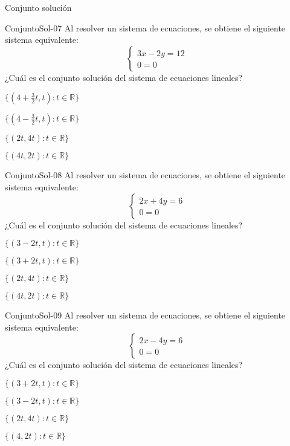\documentclass[a4,11pt]{aleph-notas}
\begin{document}
\begin{quiz}{Conjunto solución}
\begin{multi}[]%
    {ConjuntoSol-07}
    Al resolver un sistema de ecuaciones, se obtiene el siguiente sistema equivalente:
    \[
        \begin{cases}
            3x - 2y = 12 \\
            0 = 0
        \end{cases}
    \]
    ¿Cuál es el conjunto solución del sistema de ecuaciones lineales?
    \item* $\{(4+\frac{3}{2}t, t) : t\in \mathbb{R}\}$
    \item $\{(4-\frac{3}{2}t, t) : t\in \mathbb{R}\}$
    \item $\{(2t,4t) : t\in \mathbb{R}\}$
    \item $\{(4t,2t) : t\in \mathbb{R}\}$
\end{multi}

\begin{multi}[]%
    {ConjuntoSol-08}
    Al resolver un sistema de ecuaciones, se obtiene el siguiente sistema equivalente:
    \[
        \begin{cases}
            2x +4y = 6 \\
            0 = 0
        \end{cases}
    \]
    ¿Cuál es el conjunto solución del sistema de ecuaciones lineales?
    \item* $\{(3-2t, t) : t\in \mathbb{R}\}$
    \item $\{(3+2t, t) : t\in \mathbb{R}\}$
    \item $\{(2t,4t) : t\in \mathbb{R}\}$
    \item $\{(4t,2t) : t\in \mathbb{R}\}$
\end{multi}

\begin{multi}[]%
    {ConjuntoSol-09}
    Al resolver un sistema de ecuaciones, se obtiene el siguiente sistema equivalente:
    \[
        \begin{cases}
            2x - 4y = 6 \\
            0 = 0
        \end{cases}
    \]
    ¿Cuál es el conjunto solución del sistema de ecuaciones lineales?
    \item* $\{(3+2t, t) : t\in \mathbb{R}\}$
    \item $\{(3-2t, t) : t\in \mathbb{R}\}$
    \item $\{(2t,4t) : t\in \mathbb{R}\}$
    \item $\{(4,2t) : t\in \mathbb{R}\}$
\end{multi}


\end{quiz}
\end{document}

